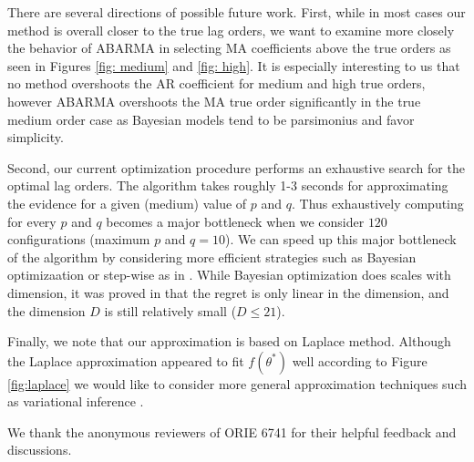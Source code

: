 There are several directions of possible future work.  First, while in most cases our method is overall closer to the true lag orders, we want to examine more closely the behavior of ABARMA in selecting MA coefficients above the true orders as seen in Figures \ref{fig: medium} and \ref{fig: high}.  It is especially interesting to us that no method overshoots the AR coefficient for medium and high true orders, however ABARMA overshoots the MA true order significantly in the true medium order case as Bayesian models tend to be parsimonius and favor simplicity.

Second, our current optimization procedure performs an exhaustive search for the optimal lag orders.  The algorithm takes roughly 1-3 seconds for approximating the evidence for a given (medium) value of $p$ and $q$.  Thus exhaustively computing for every $p$ and $q$ becomes a major bottleneck when we consider $120$ configurations (maximum $p$ and $q=10$).  We can speed up this major bottleneck of the algorithm by considering more efficient strategies such as Bayesian optimizaation \cite{snoek2012} or step-wise as in \cite{hyndman2008}.  While Bayesian optimization does scales with dimension, it was proved in \cite{kandasamy2015} that the regret is only linear in the dimension, and the dimension $D$ is still relatively small ($D \leq 21$). 


Finally, we note that our approximation is based on Laplace method.  Although the Laplace approximation appeared to fit $f(\theta^*)$ well according to Figure \ref{fig:laplace} we would like to consider more general approximation techniques such as  variational inference \cite{blei2016variational}.
\fi

\begin{acks}
We thank the anonymous reviewers of ORIE 6741 for their helpful feedback and discussions.  
\end{acks}
